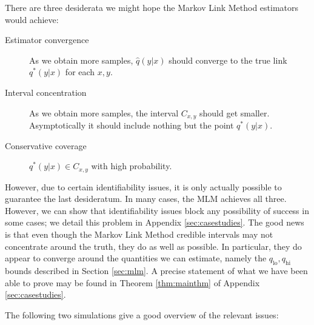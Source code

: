 There are three desiderata we might hope the Markov Link Method estimators would achieve:
\begin{description}
    \item[Estimator convergence] As we obtain more samples, $\hat q(y|x)$ should converge to the true link $q^*(y|x)$ for each $x,y$.
    \item[Interval concentration] As we obtain more samples, the interval $C_{x,y}$ should get smaller. Asymptotically it should include nothing but the point $q^*(y|x)$.
    \item[Conservative coverage] $q^*(y|x) \in C_{x,y}$ with high probability.
\end{description}
However, due to certain identifiability issues, it is only actually possible to guarantee the last desideratum.  In many cases, the MLM achieves all three.  However, we can show that identifiability issues block any possibility of success in some cases; we detail this problem in Appendix \ref{sec:casestudies}.  The good news is that even though the Markov Link Method credible intervals may not concentrate around the truth, they do as well as possible.  In particular, they do appear to converge around the quantities we can estimate, namely the $q_\mathrm{lo},q_\mathrm{hi}$ bounds described in Section \ref{sec:mlm}.  A precise  statement of what we have been able to prove may be found in Theorem \ref{thm:mainthm} of Appendix \ref{sec:casestudies}.

The following two simulations give a good overview of the relevant issues:

